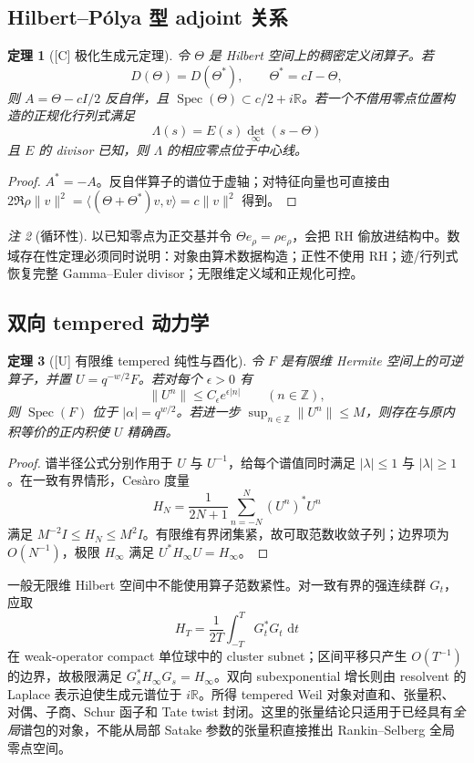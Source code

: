 \documentclass[UTF8,11pt,a4paper]{ctexart}
\newtheorem{theorem}{定理}[section]
\theoremstyle{definition}
\theoremstyle{remark}
\newtheorem{remark}[theorem]{注}
\newcommand{\R}{\mathbb R}
\newcommand{\Spec}{\operatorname{Spec}}
\newcommand{\dd}{\,\mathrm d}
\newcommand{\1}{\mathbf 1}
\newcommand{\statusU}{\textnormal{[U]}}
\newcommand{\statusC}{\textnormal{[C]}}
\begin{document}
\subsection{Hilbert--Pólya 型 adjoint 关系}

\begin{theorem}[\statusC{} 极化生成元定理]\label{thm:adjoint}
令 $\Theta$ 是 Hilbert 空间上的稠密定义闭算子。若
\[
  D(\Theta)=D(\Theta^*),\qquad \Theta^*=cI-\Theta,
\]
则 $A=\Theta-cI/2$ 反自伴，且 $\Spec(\Theta)\subset c/2+i\R$。若一个不借用零点位置构造的正规化行列式满足
\[
  \Lambda(s)=E(s)\det_\infty(s-\Theta)
\]
且 $E$ 的 divisor 已知，则 $\Lambda$ 的相应零点位于中心线。
\end{theorem}

\begin{proof}
$A^*=-A$。反自伴算子的谱位于虚轴；对特征向量也可直接由
$2\Re\rho\|v\|^2=\langle(\Theta+\Theta^*)v,v\rangle=c\|v\|^2$ 得到。
\end{proof}

\begin{remark}[循环性]
以已知零点为正交基并令 $\Theta e_\rho=\rho e_\rho$，会把 RH 偷放进结构中。数域存在性定理必须同时说明：对象由算术数据构造；正性不使用 RH；迹/行列式恢复完整 Gamma--Euler divisor；无限维定义域和正规化可控。
\end{remark}

\subsection{双向 tempered 动力学}

\begin{theorem}[\statusU{} 有限维 tempered 纯性与酉化]\label{thm:tempered}
令 $F$ 是有限维 Hermite 空间上的可逆算子，并置 $U=q^{-w/2}F$。若对每个 $\epsilon>0$ 有
\[
  \|U^n\|\leq C_\epsilon e^{\epsilon|n|}\qquad(n\in\mathbb Z),
\]
则 $\Spec(F)$ 位于 $|\alpha|=q^{w/2}$。若进一步 $\sup_{n\in\mathbb Z}\|U^n\|\leq M$，则存在与原内积等价的正内积使 $U$ 精确酉。
\end{theorem}

\begin{proof}
谱半径公式分别作用于 $U$ 与 $U^{-1}$，给每个谱值同时满足 $|\lambda|\leq1$ 与 $|\lambda|\geq1$。在一致有界情形，Ces\`aro 度量
\[
  H_N=\frac1{2N+1}\sum_{n=-N}^N(U^n)^*U^n
\]
满足 $M^{-2}I\leq H_N\leq M^2I$。有限维有界闭集紧，故可取范数收敛子列；边界项为 $O(N^{-1})$，极限 $H_\infty$ 满足 $U^*H_\infty U=H_\infty$。
\end{proof}

一般无限维 Hilbert 空间中不能使用算子范数紧性。对一致有界的强连续群 $G_t$，应取
\[
 H_T=\frac1{2T}\int_{-T}^{T}G_t^*G_t\,\dd t
\]
在 weak-operator compact 单位球中的 cluster subnet；区间平移只产生 $O(T^{-1})$ 的边界，故极限满足 $G_s^*H_\infty G_s=H_\infty$。双向 subexponential 增长则由 resolvent 的 Laplace 表示迫使生成元谱位于 $i\R$。所得 tempered Weil 对象对直和、张量积、对偶、子商、Schur 函子和 Tate twist 封闭。这里的张量结论只适用于已经具有\emph{全局}谱包的对象，不能从局部 Satake 参数的张量积直接推出 Rankin--Selberg 全局零点空间。
\end{document}
